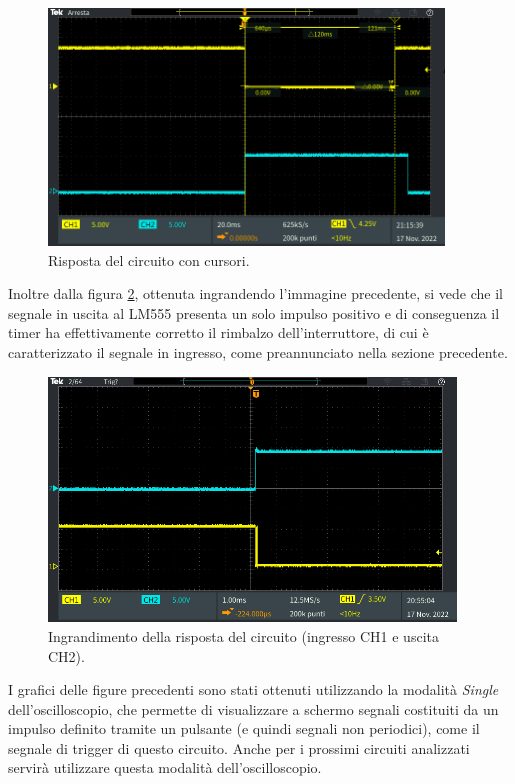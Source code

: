 \documentclass{report}
\begin{document}
\begin{figure}[h!]
	\centering
	\includegraphics[height=6.3cm]{immagini/TEK00010}
	\caption{Risposta del circuito con cursori.}
	\label{figura:TEK00010}
\end{figure}

\noindent Inoltre dalla figura \ref{figura:TEK00009}, ottenuta ingrandendo l'immagine precedente, si vede che il segnale in uscita al LM555 presenta un solo impulso positivo e di conseguenza il timer ha effettivamente corretto il rimbalzo dell'interruttore, di cui è caratterizzato il segnale in ingresso, come preannunciato nella sezione precedente.

\begin{figure}[h!]
	\centering
	\includegraphics[height=6.5cm]{immagini/TEK00009}
	\caption{Ingrandimento della risposta del circuito (ingresso CH1 e uscita CH2).}
	\label{figura:TEK00009}
\end{figure}

\noindent I grafici delle figure precedenti sono stati ottenuti utilizzando la modalità \textit{Single} dell'oscilloscopio, che permette di visualizzare a schermo segnali costituiti da un impulso definito tramite un pulsante (e quindi segnali non periodici), come il segnale di trigger di questo circuito. Anche per i prossimi circuiti analizzati servirà utilizzare questa modalità dell'oscilloscopio.
\end{document}
